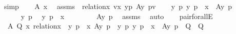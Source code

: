 \begin{isabellebody}
%
\isadelimproof
%
\endisadelimproof
%
\isatagproof
{}\isamarkupfalse%
\ {\isacharparenleft}{\kern0pt}simp{\isacharparenright}{\kern0pt}\isanewline
\ \ \isamarkupfalse%
\ A\ x\ \isamarkupfalse%
\ assms\ {\isacharcolon}{\kern0pt}\ {\isachardoublequoteopen}relation{\isacharparenleft}{\kern0pt}x{\isacharparenright}{\kern0pt}{\isachardoublequoteclose}\ {\isachardoublequoteopen}{\isasymforall}v{\isasymin}x{\isachardot}{\kern0pt}\ {\isacharparenleft}{\kern0pt}{\isasymlambda}{\isasymlangle}y{\isacharcomma}{\kern0pt}p{\isasymrangle}{\isachardot}{\kern0pt}\ A{\isacharparenleft}{\kern0pt}y{\isacharcomma}{\kern0pt}\ p{\isacharparenright}{\kern0pt}{\isacharparenright}{\kern0pt}{\isacharparenleft}{\kern0pt}v{\isacharparenright}{\kern0pt}{\isachardoublequoteclose}\isanewline
\ \ \isamarkupfalse%
\ {\isachardoublequoteopen}{\isasymAnd}y\ p{\isachardot}{\kern0pt}\ {\isasymlangle}y{\isacharcomma}{\kern0pt}\ p{\isasymrangle}\ {\isasymin}\ x\ {\isasymLongrightarrow}\ A{\isacharparenleft}{\kern0pt}y{\isacharcomma}{\kern0pt}\ p{\isacharparenright}{\kern0pt}{\isachardoublequoteclose}\isanewline
\ \ \isamarkupfalse%
\ {\isacharminus}{\kern0pt}\ \isanewline
\ \ \ \ \isamarkupfalse%
\ y\ p\ \isamarkupfalse%
\ {\isachardoublequoteopen}{\isacharless}{\kern0pt}y{\isacharcomma}{\kern0pt}\ p{\isachargreater}{\kern0pt}\ {\isasymin}\ x{\isachardoublequoteclose}\ \isanewline
\ \ \ \ \isamarkupfalse%
\ \isamarkupfalse%
\ {\isachardoublequoteopen}A{\isacharparenleft}{\kern0pt}y{\isacharcomma}{\kern0pt}\ p{\isacharparenright}{\kern0pt}{\isachardoublequoteclose}\ \isamarkupfalse%
\ assms\ \isamarkupfalse%
\ auto\isanewline
\ \ \isamarkupfalse%
\isanewline
{}\isamarkupfalse%
%
\endisatagproof
{\isafoldproof}%
%
\isadelimproof
\isanewline
%
\endisadelimproof
\isanewline
{}\isamarkupfalse%
\ pair{\isacharunderscore}{\kern0pt}forallE\ {\isacharcolon}{\kern0pt}\ \isanewline
\ \ {\isachardoublequoteopen}{\isasymAnd}A\ Q\ x{\isachardot}{\kern0pt}\ relation{\isacharparenleft}{\kern0pt}x{\isacharparenright}{\kern0pt}\ {\isasymLongrightarrow}\ {\isasymforall}{\isacharless}{\kern0pt}y{\isacharcomma}{\kern0pt}\ p{\isachargreater}{\kern0pt}\ {\isasymin}\ x{\isachardot}{\kern0pt}\ A{\isacharparenleft}{\kern0pt}y{\isacharcomma}{\kern0pt}\ p{\isacharparenright}{\kern0pt}\ {\isasymLongrightarrow}\ {\isacharparenleft}{\kern0pt}{\isacharparenleft}{\kern0pt}{\isasymAnd}y\ p{\isachardot}{\kern0pt}\ {\isacharless}{\kern0pt}y{\isacharcomma}{\kern0pt}\ p{\isachargreater}{\kern0pt}\ {\isasymin}\ x\ {\isasymLongrightarrow}\ A{\isacharparenleft}{\kern0pt}y{\isacharcomma}{\kern0pt}\ p{\isacharparenright}{\kern0pt}{\isacharparenright}{\kern0pt}\ {\isasymLongrightarrow}\ Q{\isacharparenright}{\kern0pt}\ {\isasymLongrightarrow}\ Q{\isachardoublequoteclose}\ \isanewline

\end{isabellebody}
